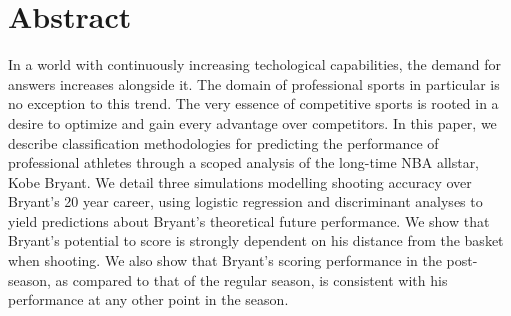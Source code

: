 \chapter*{Abstract}
In a world with continuously increasing techological capabilities, the demand for answers increases alongside it.  The domain of professional sports in particular is no exception to this trend.  The very essence of competitive sports is rooted in a desire to optimize and gain every advantage over competitors. In this paper, we describe classification methodologies for predicting the performance of professional athletes through a scoped analysis of the long-time NBA allstar, Kobe Bryant. We detail three simulations modelling shooting accuracy over Bryant's 20 year career, using logistic regression and discriminant analyses to yield predictions about Bryant's theoretical future performance.  We show that Bryant's potential to score is strongly dependent on his distance from the basket when shooting.  We also show that Bryant's scoring performance in the post-season, as compared to that of the regular season, is consistent with his performance at any other point in the season.












\pagebreak



